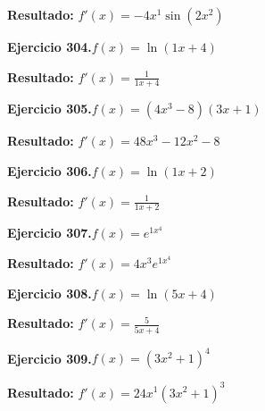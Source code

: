 \documentclass[10pt,a4paper]{article}
\begin{document}
\begin{solbox}
\textbf{Resultado:} \(\displaystyle f'(x) = -4x^{1}\sin(2x^{2})\)
\end{solbox}

\newpage
\begin{ejbox}
\textbf{Ejercicio 304.}\quad $f(x) = \ln(1x + 4)$
\end{ejbox}

\begin{solbox}
\textbf{Resultado:} \(\displaystyle f'(x) = \frac{1}{1x + 4}\)
\end{solbox}

\begin{ejbox}
\textbf{Ejercicio 305.}\quad $f(x) = (4x^{3} -8)(3x +1)$
\end{ejbox}

\begin{solbox}
\textbf{Resultado:} \(\displaystyle f'(x) = 48x^{3} -12x^{2} -8\)
\end{solbox}

\begin{ejbox}
\textbf{Ejercicio 306.}\quad $f(x) = \ln(1x + 2)$
\end{ejbox}

\begin{solbox}
\textbf{Resultado:} \(\displaystyle f'(x) = \frac{1}{1x + 2}\)
\end{solbox}

\newpage
\begin{ejbox}
\textbf{Ejercicio 307.}\quad $f(x) = e^{1x^{4}}$
\end{ejbox}

\begin{solbox}
\textbf{Resultado:} \(\displaystyle f'(x) = 4x^{3}e^{1x^{4}}\)
\end{solbox}

\begin{ejbox}
\textbf{Ejercicio 308.}\quad $f(x) = \ln(5x + 4)$
\end{ejbox}

\begin{solbox}
\textbf{Resultado:} \(\displaystyle f'(x) = \frac{5}{5x + 4}\)
\end{solbox}

\begin{ejbox}
\textbf{Ejercicio 309.}\quad $f(x) = (3x^{2} +1)^{4}$
\end{ejbox}

\begin{solbox}
\textbf{Resultado:} \(\displaystyle f'(x) = 24x^{1}(3x^{2} +1)^{3}\)
\end{solbox}
\end{document}

